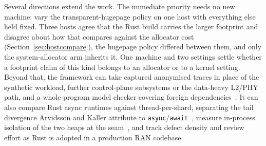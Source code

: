 Several directions extend the work. The immediate priority needs no new machine: vary the
transparent-hugepage policy on one host with everything else held fixed. Three hosts agree that
the Rust build carries the larger footprint and disagree about how that compares against the
allocator cost (Section~\ref{sec:hostcompare}), the hugepage policy differed between them, and
only the system-allocator arm inherits it. One machine and two settings settle whether a footprint
claim of this kind belongs to an allocator or to a kernel setting. Beyond that, the framework can
take captured anonymised traces in place of the synthetic workload, further control-plane
subsystems or the data-heavy L2/PHY path, and a whole-program model checker covering foreign
dependencies~\cite{pearce2026rustmc}. It can also compare Rust async runtimes against
thread-per-shard, separating the tail divergence Arvidsson and Kaller attribute to
\texttt{async}/\texttt{await}~\cite{arvidsson2025async}, measure in-process isolation of the two
heaps at the seam~\cite{rivera2021galeed,kirth2022pkrusafe}, and track defect density and review
effort as Rust is adopted in a production RAN codebase.



\cleardoublepage %

\printbibliography
